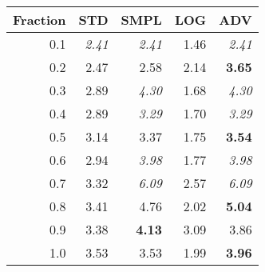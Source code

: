 \documentclass{standalone}
\begin{document}
\begin{tabular}{r|rrrr}
      \toprule
      Fraction & STD & SMPL & LOG & ADV\\
      \midrule
      0.1 & \emph{2.41} & \emph{2.41} & 1.46 & \emph{2.41}\\
  0.2 & 2.47 & 2.58 & 2.14 & \textbf{3.65}\\
  0.3 & 2.89 & \emph{4.30} & 1.68 & \emph{4.30}\\
  0.4 & 2.89 & \emph{3.29} & 1.70 & \emph{3.29}\\
  0.5 & 3.14 & 3.37 & 1.75 & \textbf{3.54}\\
  0.6 & 2.94 & \emph{3.98} & 1.77 & \emph{3.98}\\
  0.7 & 3.32 & \emph{6.09} & 2.57 & \emph{6.09}\\
  0.8 & 3.41 & 4.76 & 2.02 & \textbf{5.04}\\
  0.9 & 3.38 & \textbf{4.13} & 3.09 & 3.86\\
  1.0 & 3.53 & 3.53 & 1.99 & \textbf{3.96}\\
  \bottomrule
\end{tabular}
\end{document}
